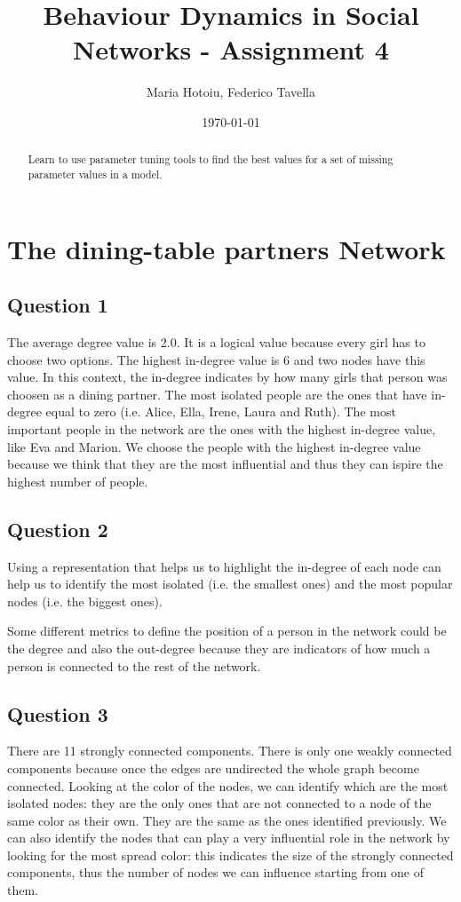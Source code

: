\documentclass[a4paper]{article}
\title{Behaviour Dynamics in Social Networks - Assignment 4}
\author{Maria Hotoiu, Federico Tavella}
\date{\today}
\begin{document}
\maketitle

\begin{abstract}
Learn to use parameter tuning tools to find the best values for a set of missing parameter values in a model.
\end{abstract}

\section{The dining-table partners Network}

\subsection{Question 1}

The average degree value is 2.0. It is a logical value because every girl has to choose two options. The highest in-degree value is 6 and two nodes have this value. In this context, the in-degree indicates by how many girls that person was choosen as a dining partner. The most isolated people are the ones that have in-degree equal to zero (i.e. Alice, Ella, Irene, Laura and Ruth). The most important people in the network are the ones with the highest in-degree value, like Eva and Marion. We choose the people with the highest in-degree value because we think that they are the most influential and thus they can ispire the highest number of people.

\subsection{Question 2}

Using a representation that helps us to highlight the in-degree of each node can help us to identify the most isolated (i.e. the smallest ones) and the most popular nodes (i.e. the biggest ones).

Some different metrics to define the position of a person in the network could be the degree and also the out-degree because they are indicators of how much a person is connected to the rest of the network.

\subsection{Question 3}

There are 11 strongly connected components. There is only one weakly connected components because once the edges are undirected the whole graph become connected. Looking at the color of the nodes, we can identify which are the most isolated nodes: they are the only ones that are not connected to a node of the same color as their own. They are the same as the ones identified previously. We can also identify the nodes that can play a very influential role in the network by looking for the most spread color: this indicates the size of the strongly connected components, thus the number of nodes we can influence starting from one of them.
\end{document}
